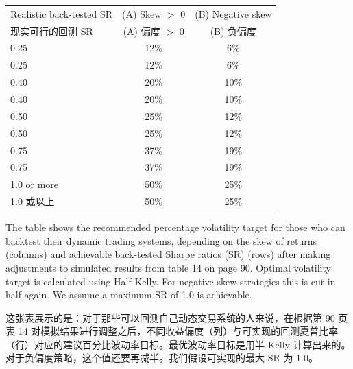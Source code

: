 \begin{bilingualtableblock} \begingroup \small \centering \begin{tabular}{@{} lcc@{}}
\toprule
Realistic back-tested SR & (A) Skew $>$ 0 & (B) Negative skew \\
现实可行的回测 SR & (A) 偏度 $>$ 0 & (B) 负偏度 \\
\midrule
0.25 & 12\% & 6\% \\
0.25 & 12\% & 6\% \\
0.40 & 20\% & 10\% \\
0.40 & 20\% & 10\% \\
0.50 & 25\% & 12\% \\
0.50 & 25\% & 12\% \\
0.75 & 37\% & 19\% \\
0.75 & 37\% & 19\% \\
1.0 or more & 50\% & 25\% \\
1.0 或以上 & 50\% & 25\% \\
\bottomrule
\end{tabular}
\par \endgroup \end{bilingualtableblock}

\begin{englishblock} The table shows the recommended percentage volatility target for those who can backtest their dynamic trading systems, depending on the skew of returns (columns) and achievable back-tested Sharpe ratios (SR) (rows) after making adjustments to simulated results from table 14 on page 90. Optimal volatility target is calculated using Half-Kelly. For negative skew strategies this is cut in half again. We assume a maximum SR of 1.0 is achievable. \end{englishblock}

\begin{chineseblock}这张表展示的是：对于那些可以回测自己动态交易系统的人来说，在根据第 90 页表 14 对模拟结果进行调整之后，不同收益偏度（列）与可实现的回测夏普比率（行）对应的建议百分比波动率目标。最优波动率目标是用半 Kelly 计算出来的。对于负偏度策略，这个值还要再减半。我们假设可实现的最大 SR 为 1.0。 \end{chineseblock}

\bipairgap

